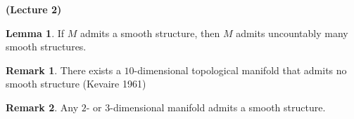 \documentclass[10pt,letterpaper,cm]{nupset}
\theoremstyle{definition}
\newtheorem{remark}{Remark}
\newtheorem{lemma}{Lemma}
\newcommand{\1}{\mathbf{1}}
\newcommand{\0}{\vec 0}
\begin{document}
\begin{center}
{\textbf{(Lecture 2)}} 
\end{center}

\theoremstyle{lemma}
\begin{lemma}{If $M$ admits a smooth structure, then $M$ admits uncountably many smooth structures.} 
\end{lemma}


\begin{remark}{There exists a $10$-dimensional topological manifold that admits no smooth structure (Kevaire 1961)} 
\end{remark}

\begin{remark}{Any $2$- or $3$-dimensional manifold admits a smooth structure.} 
\end{remark}
\end{document}
